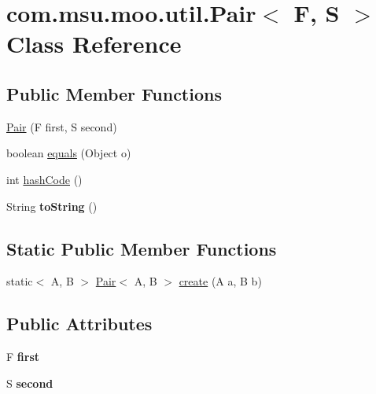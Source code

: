 \hypertarget{classcom_1_1msu_1_1moo_1_1util_1_1Pair_3_01F_00_01S_01_4}{\section{com.\-msu.\-moo.\-util.\-Pair$<$ F, S $>$ Class Reference}
\label{classcom_1_1msu_1_1moo_1_1util_1_1Pair_3_01F_00_01S_01_4}
}
\subsection*{Public Member Functions}
\begin{DoxyCompactItemize}
\item 
\hyperlink{classcom_1_1msu_1_1moo_1_1util_1_1Pair_3_01F_00_01S_01_4_a397b4d82aaefe176d1fb7f11d4f90f36}{Pair} (F first, S second)
\item 
boolean \hyperlink{classcom_1_1msu_1_1moo_1_1util_1_1Pair_3_01F_00_01S_01_4_afc75acfd72556f99a2bb8a95db6730cc}{equals} (Object o)
\item 
int \hyperlink{classcom_1_1msu_1_1moo_1_1util_1_1Pair_3_01F_00_01S_01_4_a8357b8dd6a4dea9b9d9fe3458e202bda}{hash\-Code} ()
\item 
\hypertarget{classcom_1_1msu_1_1moo_1_1util_1_1Pair_3_01F_00_01S_01_4_a588ae39cea02c367f99b619f8300ad4d}{String {\bfseries to\-String} ()}\label{classcom_1_1msu_1_1moo_1_1util_1_1Pair_3_01F_00_01S_01_4_a588ae39cea02c367f99b619f8300ad4d}

\end{DoxyCompactItemize}
\subsection*{Static Public Member Functions}
\begin{DoxyCompactItemize}
\item 
static$<$ A, B $>$ \hyperlink{classcom_1_1msu_1_1moo_1_1util_1_1Pair_3_01F_00_01S_01_4_a397b4d82aaefe176d1fb7f11d4f90f36}{Pair}$<$ A, B $>$ \hyperlink{classcom_1_1msu_1_1moo_1_1util_1_1Pair_3_01F_00_01S_01_4_a2c56a6a21d8d6a667415fc484548fc49}{create} (A a, B b)
\end{DoxyCompactItemize}
\subsection*{Public Attributes}
\begin{DoxyCompactItemize}
\item 
\hypertarget{classcom_1_1msu_1_1moo_1_1util_1_1Pair_3_01F_00_01S_01_4_a2a0d6a70275719bb02c5d5b2bcc3b270}{F {\bfseries first}}\label{classcom_1_1msu_1_1moo_1_1util_1_1Pair_3_01F_00_01S_01_4_a2a0d6a70275719bb02c5d5b2bcc3b270}

\item 
\hypertarget{classcom_1_1msu_1_1moo_1_1util_1_1Pair_3_01F_00_01S_01_4_aadab39e9459347f317aac90e13fda1e0}{S {\bfseries second}}\label{classcom_1_1msu_1_1moo_1_1util_1_1Pair_3_01F_00_01S_01_4_aadab39e9459347f317aac90e13fda1e0}

\end{DoxyCompactItemize}


